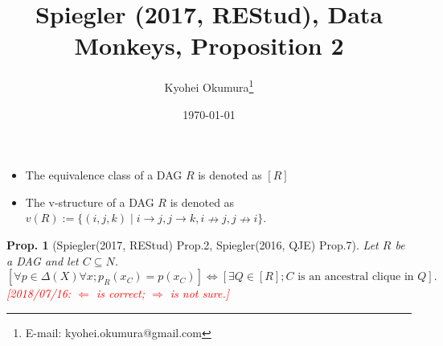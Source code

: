 \documentclass[11pt,a4paper,dvipdfmx]{article}
\theoremstyle{plain}
\newtheorem{prop}{Prop.}[section]
\newcommand{\equi}{\Longleftrightarrow}
\newcommand{\ocomment}[1]{{\textcolor{red}{#1}}}
\begin{document}
\title{Spiegler (2017, REStud), Data Monkeys, Proposition 2
}
\author{Kyohei Okumura{\footnote{E-mail: kyohei.okumura@gmail.com}
}}
\date{\today}
\maketitle


\begin{itemize}
	\item The equivalence class of a DAG $R$ is denoted as $[R]$
	\item The v-structure of a DAG $R$ is denoted as $v(R) := \{(i,j,k) \mid i \to j, j \to k, i \nrightarrow j, j \nrightarrow i \}$.
\end{itemize}

\begin{prop}[Spiegler(2017, REStud) Prop.2, Spiegler(2016, QJE) Prop.7] \label{prop_sp2017} 
	Let $R$ be a DAG and let $C \subseteq N$.
	\[
	[\forall p \in \Delta(X) \forall x; p_R(x_C) = p(x_C)]
	\equi
	[\exists Q \in [R]; C \text{ is an ancestral clique in } Q].
	\]
	\ocomment{[2018/07/16: $\Leftarrow$ is correct; $\Rightarrow$ is not sure.]}
\end{prop}
\end{document}
